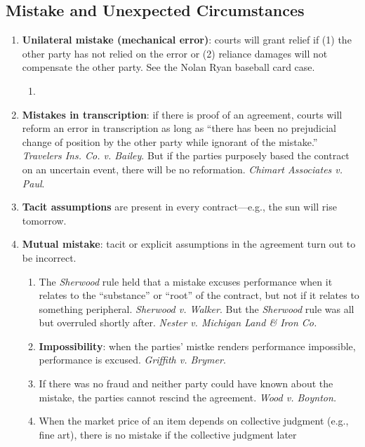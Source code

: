 \subsection{Mistake and Unexpected Circumstances}
\begin{enumerate}
    \item \textbf{Unilateral mistake (mechanical error)}: courts will grant 
    relief if (1) the other party has not relied on the error or (2) reliance 
    damages will not compensate the other party. See the Nolan Ryan baseball 
    card case.
    \begin{enumerate}
        \item %
    \end{enumerate}
    \item \textbf{Mistakes in transcription}: if there is proof of an 
    agreement, courts will reform an error in transcription as long as ``there 
    has been no prejudicial change of position by the other party while 
    ignorant of the mistake.'' \emph{Travelers Ins. Co. v. Bailey}. But if the 
    parties purposely based the contract on an uncertain event, there will be 
    no reformation. \emph{Chimart Associates v. Paul}.
    \item \textbf{Tacit assumptions} are present in every contract---e.g., the 
    sun will rise tomorrow.
    \item \textbf{Mutual mistake}: tacit or explicit assumptions in the 
    agreement turn out to be incorrect.
    \begin{enumerate}
        \item The \emph{Sherwood} rule held that a mistake excuses performance 
        when it relates to the ``substance'' or ``root'' of the contract, but 
        not if it relates to something peripheral. \emph{Sherwood v. Walker}. 
        But the \emph{Sherwood} rule was all but overruled shortly after. 
        \emph{Nester v. Michigan Land \& Iron Co.}
        \item \textbf{Impossibility}: when the parties' mistke renders 
        performance impossible, performance is excused. \emph{Griffith v. 
        Brymer}.
        \item If there was no fraud and neither party could have known about 
        the mistake, the parties cannot rescind the agreement. \emph{Wood v. 
        Boynton.}
        \item When the market price of an item depends on collective judgment 
        (e.g., fine art), there is no mistake if the collective judgment later 

\end{enumerate}
\end{enumerate}
